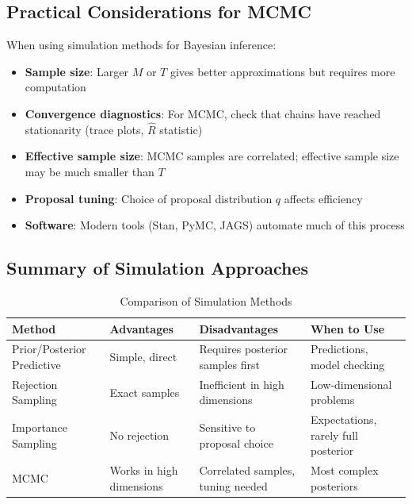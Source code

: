 \subsection{Practical Considerations for MCMC}
When using simulation methods for Bayesian inference:

\begin{itemize}
\item \textbf{Sample size}: Larger $M$ or $T$ gives better approximations but requires more computation
\item \textbf{Convergence diagnostics}: For MCMC, check that chains have reached stationarity (trace plots, $\hat{R}$ statistic)
\item \textbf{Effective sample size}: MCMC samples are correlated; effective sample size may be much smaller than $T$
\item \textbf{Proposal tuning}: Choice of proposal distribution $q$ affects efficiency
\item \textbf{Software}: Modern tools (Stan, PyMC, JAGS) automate much of this process
\end{itemize}

\subsection{Summary of Simulation Approaches}
\begin{table}[h]
\centering
\caption{Comparison of Simulation Methods}
\begin{tabular}{lp{3cm}p{3cm}p{3cm}}
\toprule
\textbf{Method} & \textbf{Advantages} & \textbf{Disadvantages} & \textbf{When to Use} \\
\midrule
Prior/Posterior Predictive & Simple, direct & Requires posterior samples first & Predictions, model checking \\
Rejection Sampling & Exact samples & Inefficient in high dimensions & Low-dimensional problems \\
Importance Sampling & No rejection & Sensitive to proposal choice & Expectations, rarely full posterior \\
MCMC & Works in high dimensions & Correlated samples, tuning needed & Most complex posteriors \\
\bottomrule
\end{tabular}
\end{table}

